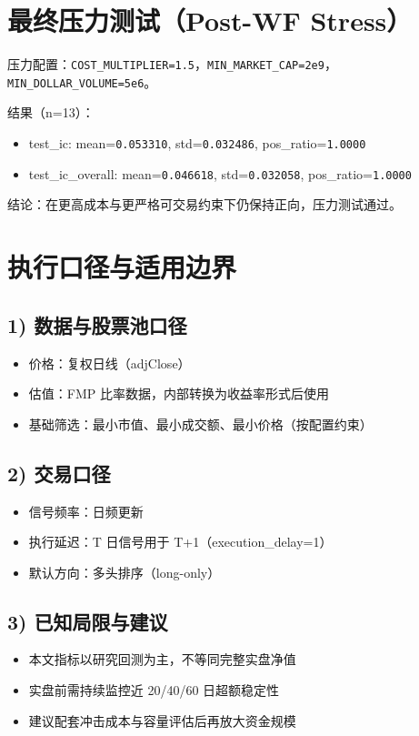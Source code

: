 \documentclass[12pt,a4paper,fontset=fandol]{ctexart}
\begin{document}
\section{最终压力测试（Post-WF Stress）}
压力配置：\texttt{COST\_MULTIPLIER=1.5}，\texttt{MIN\_MARKET\_CAP=2e9}，\texttt{MIN\_DOLLAR\_VOLUME=5e6}。

结果（n=13）：
\begin{itemize}
  \item test\_ic: mean=\texttt{0.053310}, std=\texttt{0.032486}, pos\_ratio=\texttt{1.0000}
  \item test\_ic\_overall: mean=\texttt{0.046618}, std=\texttt{0.032058}, pos\_ratio=\texttt{1.0000}
\end{itemize}

结论：在更高成本与更严格可交易约束下仍保持正向，压力测试通过。

\section{执行口径与适用边界}
\subsection*{1) 数据与股票池口径}
\begin{itemize}
  \item 价格：复权日线（adjClose）
  \item 估值：FMP 比率数据，内部转换为收益率形式后使用
  \item 基础筛选：最小市值、最小成交额、最小价格（按配置约束）
\end{itemize}

\subsection*{2) 交易口径}
\begin{itemize}
  \item 信号频率：日频更新
  \item 执行延迟：T 日信号用于 T+1（execution\_delay=1）
  \item 默认方向：多头排序（long-only）
\end{itemize}

\subsection*{3) 已知局限与建议}
\begin{itemize}
  \item 本文指标以研究回测为主，不等同完整实盘净值
  \item 实盘前需持续监控近 20/40/60 日超额稳定性
  \item 建议配套冲击成本与容量评估后再放大资金规模
\end{itemize}
\end{document}
